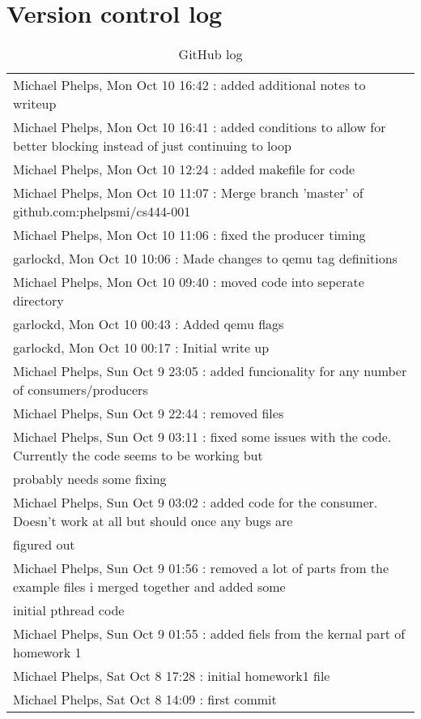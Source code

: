 \documentclass[letterpaper,10pt,titlepage]{article}
\begin{document}
\section{Version control log}
\begin{table}[H]
  \small
\caption{GitHub log}

\begin{tabular}{l}
\hline
Michael Phelps, Mon Oct 10 16:42 : added additional notes to writeup\\
Michael Phelps, Mon Oct 10 16:41 : added conditions to allow for better blocking instead of just continuing to loop\\
Michael Phelps, Mon Oct 10 12:24 : added makefile for code\\
Michael Phelps, Mon Oct 10 11:07 : Merge branch 'master' of github.com:phelpsmi/cs444-001\\
Michael Phelps, Mon Oct 10 11:06 : fixed the producer timing\\
garlockd, Mon Oct 10 10:06 : Made changes to qemu tag definitions\\
Michael Phelps, Mon Oct 10 09:40 : moved code into seperate directory\\
garlockd, Mon Oct 10 00:43 : Added qemu flags\\
garlockd, Mon Oct 10 00:17 : Initial write up\\
Michael Phelps, Sun Oct 9 23:05 : added funcionality for any number of consumers/producers\\
Michael Phelps, Sun Oct 9 22:44 : removed files\\
Michael Phelps, Sun Oct 9 03:11 : fixed some issues with the code. Currently the code seems to be working but\\ probably needs some fixing\\
Michael Phelps, Sun Oct 9 03:02 : added code for the consumer. Doesn't work at all but should once any bugs are\\ figured out\\
Michael Phelps, Sun Oct 9 01:56 : removed a lot of parts from the example files i merged together and added some\\ initial pthread code\\
Michael Phelps, Sun Oct 9 01:55 : added fiels from the kernal part of homework 1\\
Michael Phelps, Sat Oct 8 17:28 : initial homework1 file\\
Michael Phelps, Sat Oct 8 14:09 : first commit\\
\hline
\end{tabular}
\end{table}
\end{document}
